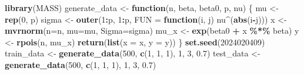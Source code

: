 \documentclass[
]{article}
\newenvironment{Shaded}{\begin{snugshade}}{\end{snugshade}}
\newcommand{\AttributeTok}[1]{\textcolor[rgb]{0.13,0.29,0.53}{#1}}
\newcommand{\ControlFlowTok}[1]{\textcolor[rgb]{0.13,0.29,0.53}{\textbf{#1}}}
\newcommand{\DecValTok}[1]{\textcolor[rgb]{0.00,0.00,0.81}{#1}}
\newcommand{\FloatTok}[1]{\textcolor[rgb]{0.00,0.00,0.81}{#1}}
\newcommand{\FunctionTok}[1]{\textcolor[rgb]{0.13,0.29,0.53}{\textbf{#1}}}
\newcommand{\NormalTok}[1]{#1}
\newcommand{\OtherTok}[1]{\textcolor[rgb]{0.56,0.35,0.01}{#1}}
\newcommand{\SpecialCharTok}[1]{\textcolor[rgb]{0.81,0.36,0.00}{\textbf{#1}}}
\begin{document}
\begin{Shaded}
\begin{Highlighting}[]
\FunctionTok{library}\NormalTok{(MASS)}
\NormalTok{generate\_data }\OtherTok{\textless{}{-}} \ControlFlowTok{function}\NormalTok{(n, beta, beta0, p, nu) \{}
\NormalTok{  mu }\OtherTok{\textless{}{-}} \FunctionTok{rep}\NormalTok{(}\DecValTok{0}\NormalTok{, p)}
\NormalTok{  sigma }\OtherTok{\textless{}{-}} \FunctionTok{outer}\NormalTok{(}\DecValTok{1}\SpecialCharTok{:}\NormalTok{p, }\DecValTok{1}\SpecialCharTok{:}\NormalTok{p, }\AttributeTok{FUN =} \ControlFlowTok{function}\NormalTok{(i, j) nu}\SpecialCharTok{\^{}}\NormalTok{(}\FunctionTok{abs}\NormalTok{(i}\SpecialCharTok{{-}}\NormalTok{j)))}
\NormalTok{  x }\OtherTok{\textless{}{-}} \FunctionTok{mvrnorm}\NormalTok{(}\AttributeTok{n=}\NormalTok{n, }\AttributeTok{mu=}\NormalTok{mu, }\AttributeTok{Sigma=}\NormalTok{sigma)}
\NormalTok{  mu\_x }\OtherTok{\textless{}{-}} \FunctionTok{exp}\NormalTok{(beta0 }\SpecialCharTok{+}\NormalTok{ x }\SpecialCharTok{\%*\%}\NormalTok{ beta)}
\NormalTok{  y }\OtherTok{\textless{}{-}} \FunctionTok{rpois}\NormalTok{(n, mu\_x)}
  \FunctionTok{return}\NormalTok{(}\FunctionTok{list}\NormalTok{(}\AttributeTok{x =}\NormalTok{ x, }\AttributeTok{y =}\NormalTok{ y))}
\NormalTok{\}}
\FunctionTok{set.seed}\NormalTok{(}\DecValTok{2024020409}\NormalTok{)}
\NormalTok{train\_data }\OtherTok{\textless{}{-}} \FunctionTok{generate\_data}\NormalTok{(}\DecValTok{500}\NormalTok{, }\FunctionTok{c}\NormalTok{(}\DecValTok{1}\NormalTok{, }\DecValTok{1}\NormalTok{, }\DecValTok{1}\NormalTok{), }\DecValTok{1}\NormalTok{, }\DecValTok{3}\NormalTok{, }\FloatTok{0.7}\NormalTok{)}
\NormalTok{test\_data }\OtherTok{\textless{}{-}} \FunctionTok{generate\_data}\NormalTok{(}\DecValTok{500}\NormalTok{, }\FunctionTok{c}\NormalTok{(}\DecValTok{1}\NormalTok{, }\DecValTok{1}\NormalTok{, }\DecValTok{1}\NormalTok{), }\DecValTok{1}\NormalTok{, }\DecValTok{3}\NormalTok{, }\FloatTok{0.7}\NormalTok{)}
\end{Highlighting}
\end{Shaded}
\end{document}
